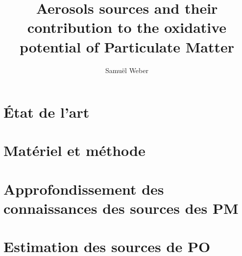 \documentclass[a4paper,11pt]{book}
\author{Samuël Weber}
\title{Aerosols sources and their contribution to the oxidative potential of Particulate Matter}
\begin{document}
% 
\maketitle

\frontmatter

\clearpage
% 
%

\tableofcontents

\mainmatter



\clearpage

\chapter{État de l'art}
\label{cha:etat_de_lart}
\PartialToc
\clearpage

\clearpage
\printbibliography[segment=\therefsegment,heading=subbibliography]

\chapter{Matériel et méthode}
\label{cha:materiel_et_methode}
\PartialToc
\clearpage

\clearpage
\printbibliography[segment=\therefsegment,heading=subbibliography]

\chapter{Approfondissement des connaissances des sources des PM}%
\label{cha:approfondissement_des_connaissances_des_sources_des_pm}
\PartialToc
\clearpage

\clearpage
\printbibliography[segment=\therefsegment,heading=subbibliography]

\chapter{Estimation des sources de PO}
\label{cha:estimation_des_sources_de_PO}
\PartialToc
\clearpage

\clearpage
\printbibliography[segment=\therefsegment,heading=subbibliography]
\end{document}
